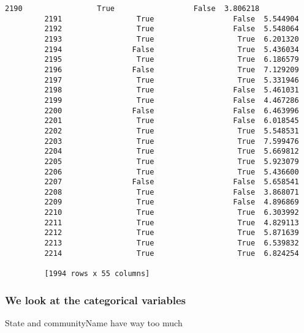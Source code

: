 \documentclass[11pt]{llncs}
\begin{document}
\begin{Verbatim}[commandchars=\\\{\}]
         2190                 True                  False  3.806218  
         2191                 True                  False  5.544904  
         2192                 True                  False  5.548064  
         2193                 True                   True  6.201320  
         2194                False                   True  5.436034  
         2195                 True                   True  6.186579  
         2196                False                   True  7.129209  
         2197                 True                   True  5.331946  
         2198                 True                  False  5.461031  
         2199                 True                  False  4.467286  
         2200                False                  False  6.463996  
         2201                 True                  False  6.018545  
         2202                 True                   True  5.548531  
         2203                 True                   True  7.599476  
         2204                 True                   True  5.669812  
         2205                 True                   True  5.923079  
         2206                 True                   True  5.436600  
         2207                False                  False  5.658541  
         2208                 True                  False  3.868071  
         2209                 True                  False  4.896869  
         2210                 True                   True  6.303992  
         2211                 True                   True  4.829113  
         2212                 True                   True  5.871639  
         2213                 True                   True  6.539832  
         2214                 True                   True  6.824254  
         
         [1994 rows x 55 columns]
\end{Verbatim}
            
    \subsubsection{We look at the categorical
variables}\label{we-look-at-the-categorical-variables}

    State and communityName have way too much
\end{document}
